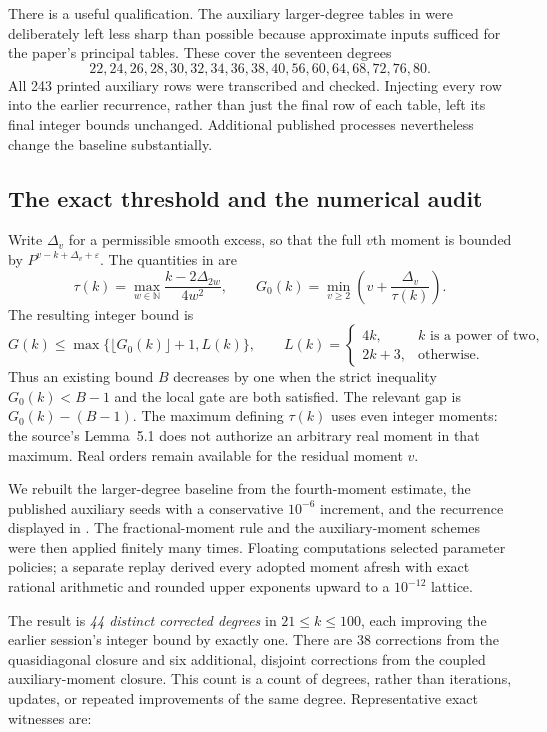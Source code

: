 \documentclass[11pt,letterpaper]{article}
\numberwithin{equation}{section}
\begin{document}
There is a useful qualification. The auxiliary larger-degree tables in
\cite[\S23]{VW00} were deliberately left less sharp than possible because
approximate inputs sufficed for the paper's principal tables. These cover
the seventeen degrees
\[
22,24,26,28,30,32,34,36,38,40,56,60,64,68,72,76,80.
\]
All 243 printed auxiliary rows were transcribed and checked. Injecting
every row into the earlier recurrence, rather than just the final row of
each table, left its final integer bounds unchanged. Additional published
processes nevertheless change the baseline substantially.

\subsection{The exact threshold and the numerical audit}

Write $\Delta_v$ for a permissible smooth excess, so that the full
$v$th moment is bounded by $P^{v-k+\Delta_v+\varepsilon}$. The quantities in
\cite[(5.1), (6.11), Theorem~6.2]{BW23} are
\[
 \tau(k)=\max_{w\in\mathbb N}
       \frac{k-2\Delta_{2w}}{4w^2},
 \qquad
 G_0(k)=\min_{v\ge2}\left(v+\frac{\Delta_v}{\tau(k)}\right).
\]
The resulting integer bound is
\[
 G(k)\le\max\{\lfloor G_0(k)\rfloor+1,L(k)\},
 \qquad
 L(k)=\begin{cases}4k,&k\text{ is a power of two},\\2k+3,&\text{otherwise}.
 \end{cases}
\]
Thus an existing bound $B$ decreases by one when the strict inequality
$G_0(k)<B-1$ and the local gate are both satisfied. The relevant gap is
$G_0(k)-(B-1)$. The maximum defining $\tau(k)$ uses even integer moments:
the source's Lemma~5.1 does not authorize an arbitrary real moment in that
maximum. Real orders remain available for the residual moment $v$.

We rebuilt the larger-degree baseline from the fourth-moment estimate,
the published auxiliary seeds with a conservative $10^{-6}$ increment,
and the recurrence displayed in \cite[proof of Theorem~2.1, (2.3)]{W93}.
The fractional-moment rule \cite[Lemma~1]{W00QD} and the auxiliary-moment
schemes \cite[Theorem~3.4 and \S4]{VW00} were then applied finitely many
times. Floating computations selected parameter policies; a separate
replay derived every adopted moment afresh with exact rational arithmetic
and rounded upper exponents upward to a $10^{-12}$ lattice.

The result is \emph{44 distinct corrected degrees} in $21\le k\le100$,
each improving the earlier session's integer bound by exactly one.
There are 38 corrections from the quasidiagonal closure and six additional,
disjoint corrections from the coupled auxiliary-moment closure. This count
is a count of degrees, rather than iterations, updates, or repeated
improvements of the same degree. Representative exact witnesses are:
\end{document}
